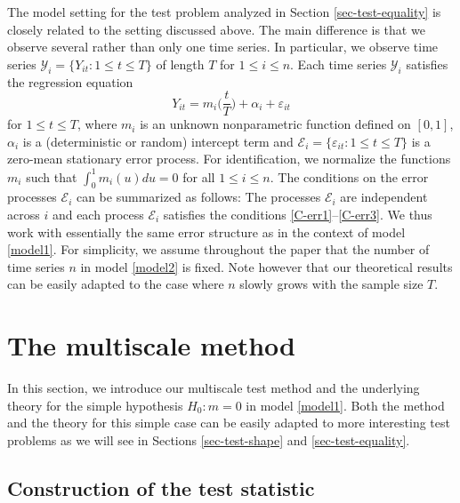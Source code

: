 \documentclass[a4paper,12pt]{article}
\numberwithin{equation}{section}
\begin{document}
The model setting for the test problem analyzed in Section \ref{sec-test-equality} is closely related to the setting discussed above. The main difference is that we observe several rather than only one time series. In particular, we observe time series $\mathcal{Y}_i = \{Y_{it}: 1 \le t \le T \}$ of length $T$ for $1 \le i \le n$. Each time series $\mathcal{Y}_i$ satisfies the regression equation \begin{equation}\label{model2}
Y_{it} = m_i \Big( \frac{t}{T} \Big) + \alpha_i + \varepsilon_{it} 
\end{equation}
for $1 \le t \le T$, where $m_i$ is an unknown nonparametric function defined on $[0,1]$, $\alpha_i$ is a (deterministic or random) intercept term and $\mathcal{E}_i = \{ \varepsilon_{it}: 1 \le t \le T \}$ is a zero-mean stationary error process. For identification, we normalize the functions $m_i$ such that $\int_0^1 m_i(u) du = 0$ for all $1 \le i \le n$. The conditions on the error processes $\mathcal{E}_i$ can be summarized as follows: The processes $\mathcal{E}_i$ are independent across $i$ and each process $\mathcal{E}_i$ satisfies the conditions \ref{C-err1}--\ref{C-err3}. We thus work with essentially the same error structure as in the context of model \eqref{model1}. For simplicity, we assume throughout the paper that the number of time series $n$ in model \eqref{model2} is fixed. Note however that our theoretical results can be easily adapted to the case where $n$ slowly grows with the sample size $T$. 



\section{The multiscale method}\label{sec-method}


In this section, we introduce our multiscale test method and the underlying theory for the simple hypothesis $H_0: m = 0$ in model \eqref{model1}. Both the method and the theory for this simple case can be easily adapted to more interesting test problems as we will see in Sections \ref{sec-test-shape} and \ref{sec-test-equality}. 


\subsection{Construction of the test statistic}\label{subsec-method-stat}
\end{document}
